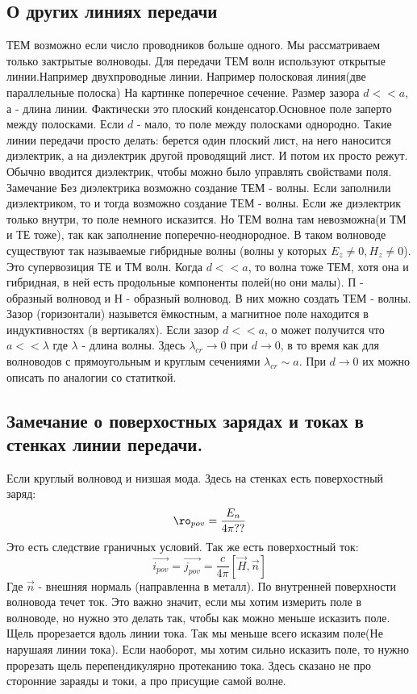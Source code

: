 \subsection{О других линиях передачи}

ТЕМ возможно если число проводников больше одного. Мы рассматриваем только зактрытые волноводы.
%
Для передачи ТЕМ волн используют открытые линии.Например двухпроводные линии.
%
Например полосковая линия(две параллельные полоска)
На картинке поперечное сечение.
%
Размер зазора $d<< a$, а - длина линии. Фактически это плоский конденсатор.Основное поле заперто между полосками.
%
Если $d$ - мало, то поле между полосками однородно.
%
Такие линии передачи просто делать: берется один плоский лист, на него наносится диэлектрик, а на диэлектрик другой проводящий лист. И потом их просто режут.
%
Обычно вводится диэлектрик, чтобы можно было управлять свойствами поля.
%
Замечание
%
Без диэлектрика возможно создание ТЕМ - волны. Если заполнили диэлектриком, то и тогда возможно создание ТЕМ - волны.  
%
Если же диэлектрик только внутри, то поле немного исказится. Но ТЕМ волна там невозможна(и ТМ и ТЕ тоже), так как заполнение поперечно-неоднородное.
%
В таком волноводе существуют так называемые гибридные волны (волны у которых $E_z \neq 0, H_z \neq 0$). Это супервозиция ТЕ и ТМ волн.
%
Когда $d<<a$, то волна тоже ТЕМ, хотя она и гибридная, в ней есть продольные компоненты полей(но они малы).
%
П - образный волновод и Н - образный волновод.
%
В них можно создать ТЕМ - волны.
%
Зазор (горизонтали) назывется ёмкостным, а магнитное поле находится в индуктивностях (в вертикалях).
%
Если зазор $d <<a$, о может получится что $a << \lambda$ где $\lambda$ - длина волны. Здесь $\lambda_{cr} \rightarrow 0$ при $d \rightarrow 0$, в то время как для волноводов с прямоугольным и круглым сечениями  $\lambda_{cr} \sim a$.
%
При $d \rightarrow 0$ их можно описать по аналогии со статиткой.
%
\subsection{Замечание о поверхостных зарядах и токах в стенках линии передачи.}
%
Если круглый волновод и низшая мода.
%
Здесь на стенках есть поверхостный заряд:
\begin{equation}
	\ro_{pov} = \frac{E_n}{4 \pi ??}
\end{equation}
Это есть следствие граничных условий.
Так же есть поверхостный ток:
\begin{equation}
	\vec{i_{pov}} = \vec{j_{pov}} = \frac{c}{4 \pi} [\vec{H}, \vec{n}]
\end{equation}
Где $\vec{n}$ - внешняя нормаль (направленна в металл).
%
По внутренней поверхности волновода течет ток. Это важно значит, если мы хотим измерить поле в волноводе, но нужно это делать так, чтобы как можно меньше исказить поле.
%
Щель прорезается вдоль линии тока. Так мы меньше всего исказим поле(Не нарушаяя линии тока).
%
Если наоборот, мы хотим сильно исказить поле, то нужно прорезать щель перепендикулярно протеканию тока.
%
Здесь сказано не про сторонние зараяды и токи, а про присущие самой волне.
%
